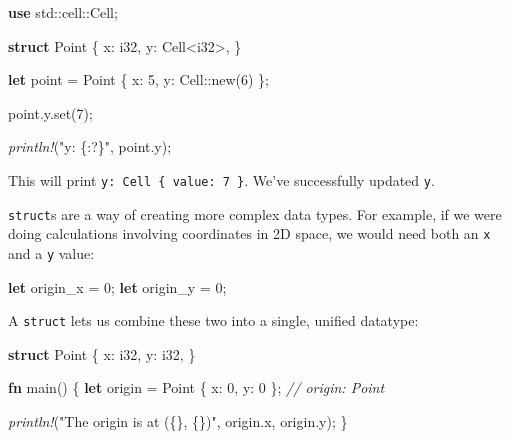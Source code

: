 \documentclass[a4paper,]{book}
\newenvironment{Shaded}{\begin{snugshade}}{\end{snugshade}}
\newcommand{\KeywordTok}[1]{\textcolor[rgb]{0.13,0.29,0.53}{\textbf{{#1}}}}
\newcommand{\DataTypeTok}[1]{\textcolor[rgb]{0.13,0.29,0.53}{{#1}}}
\newcommand{\DecValTok}[1]{\textcolor[rgb]{0.00,0.00,0.81}{{#1}}}
\newcommand{\StringTok}[1]{\textcolor[rgb]{0.31,0.60,0.02}{{#1}}}
\newcommand{\CommentTok}[1]{\textcolor[rgb]{0.56,0.35,0.01}{\textit{{#1}}}}
\newcommand{\PreprocessorTok}[1]{\textcolor[rgb]{0.56,0.35,0.01}{\textit{{#1}}}}
\newcommand{\NormalTok}[1]{{#1}}
\begin{document}
\begin{Shaded}
\begin{Highlighting}[]
\KeywordTok{use} \NormalTok{std::cell::Cell;}

\KeywordTok{struct} \NormalTok{Point \{}
    \NormalTok{x: }\DataTypeTok{i32}\NormalTok{,}
    \NormalTok{y: Cell<}\DataTypeTok{i32}\NormalTok{>,}
\NormalTok{\}}

\KeywordTok{let} \NormalTok{point = Point \{ x: }\DecValTok{5}\NormalTok{, y: Cell::new(}\DecValTok{6}\NormalTok{) \};}

\NormalTok{point.y.set(}\DecValTok{7}\NormalTok{);}

\PreprocessorTok{println!}\NormalTok{(}\StringTok{"y: \{:?\}"}\NormalTok{, point.y);}
\end{Highlighting}
\end{Shaded}

This will print \texttt{y:\ Cell\ \{\ value:\ 7\ \}}. We've successfully
updated \texttt{y}.


\texttt{struct}s are a way of creating more complex data types. For
example, if we were doing calculations involving coordinates in 2D
space, we would need both an \texttt{x} and a \texttt{y} value:

\begin{Shaded}
\begin{Highlighting}[]
\KeywordTok{let} \NormalTok{origin_x = }\DecValTok{0}\NormalTok{;}
\KeywordTok{let} \NormalTok{origin_y = }\DecValTok{0}\NormalTok{;}
\end{Highlighting}
\end{Shaded}

A \texttt{struct} lets us combine these two into a single, unified
datatype:

\begin{Shaded}
\begin{Highlighting}[]
\KeywordTok{struct} \NormalTok{Point \{}
    \NormalTok{x: }\DataTypeTok{i32}\NormalTok{,}
    \NormalTok{y: }\DataTypeTok{i32}\NormalTok{,}
\NormalTok{\}}

\KeywordTok{fn} \NormalTok{main() \{}
    \KeywordTok{let} \NormalTok{origin = Point \{ x: }\DecValTok{0}\NormalTok{, y: }\DecValTok{0} \NormalTok{\}; }\CommentTok{// origin: Point}

    \PreprocessorTok{println!}\NormalTok{(}\StringTok{"The origin is at (\{\}, \{\})"}\NormalTok{, origin.x, origin.y);}
\NormalTok{\}}
\end{Highlighting}
\end{Shaded}
\end{document}
